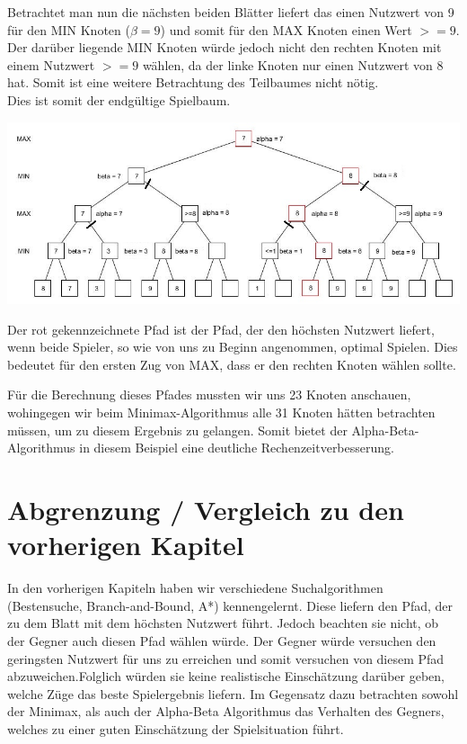  Betrachtet man nun die nächsten beiden Blätter liefert das einen Nutzwert von 9 für den MIN Knoten ($\beta =9$) und somit für den MAX Knoten einen Wert $>=9$. Der darüber liegende MIN Knoten würde jedoch nicht den rechten Knoten mit einem Nutzwert $>=9$ wählen, da der linke Knoten nur einen Nutzwert von 8 hat. Somit ist eine weitere Betrachtung des Teilbaumes nicht nötig.\\
 Dies ist somit der endgültige Spielbaum.

 \begin{center}
 	\includegraphics[width = 12 cm]{chapters/minimax/jpg/Alpha-beta10.jpg}
 \end{center}

 Der rot gekennzeichnete Pfad ist der Pfad, der den höchsten Nutzwert liefert, wenn beide Spieler, so wie von uns zu Beginn angenommen, optimal Spielen. Dies bedeutet für den ersten Zug von MAX, dass er den rechten Knoten wählen sollte.

 Für die Berechnung dieses Pfades mussten wir uns 23 Knoten anschauen, wohingegen wir beim Minimax-Algorithmus alle 31 Knoten hätten betrachten müssen, um zu diesem Ergebnis zu gelangen. Somit bietet der Alpha-Beta-Algorithmus in diesem Beispiel eine deutliche Rechenzeitverbesserung.

\section{Abgrenzung / Vergleich zu den vorherigen Kapitel}

In den vorherigen Kapiteln haben wir verschiedene Suchalgorithmen (Bestensuche, Branch-and-Bound, A*) kennengelernt. Diese liefern den Pfad, der zu dem Blatt mit dem höchsten Nutzwert führt. Jedoch beachten sie nicht, ob der Gegner auch diesen Pfad wählen würde. Der Gegner würde versuchen den geringsten Nutzwert für uns zu erreichen und somit versuchen von diesem Pfad abzuweichen.Folglich würden sie keine realistische Einschätzung darüber geben, welche Züge das beste Spielergebnis liefern. Im Gegensatz dazu betrachten sowohl der Minimax, als auch der Alpha-Beta Algorithmus das Verhalten des Gegners, welches zu einer guten Einschätzung der Spielsituation führt.



